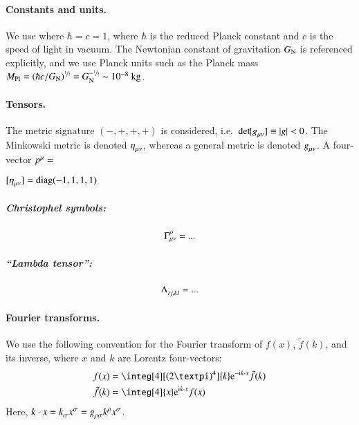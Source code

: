 


\paragraph{Constants and units.} %
We use  where $\hbar = c = 1$, where $\hbar$ is the reduced Planck constant and $c$ is the speed of light in vacuum. The Newtonian constant of gravitation $G_\mathrm{N}$ is referenced explicitly, and we use Planck units such as the Planck mass $M_{\mathrm{Pl}} = \left( \hbar c /G_\mathrm{N} \right)^{\sfrac{1}{2}} = G_\mathrm{N}^{-\sfrac{1}{2}} \sim 10^{-8} ~\mathrm{kg}$. 
%

\paragraph{Tensors.} %
The metric signature $(-,+,+,+)$ is considered, i.e.~$\det~\!\![g\indices{_{\mu\nu}}] \equiv \abs{g} < 0 $. The Minkowski metric is denoted $\eta\indices{_{\mu\nu}}$, whereas a general metric is denoted $g\indices{_{\mu\nu}}$. A four-vector $p\indices{^{\mu}} = $

$[\eta\lo{\mu\nu}] = \text{diag}(-1, 1, 1, 1)$

\subparagraph[Gamma]{Christophel symbols:} %
\begin{equation}
    \tensor*{\Gamma}{^\rho_{\mu \nu}} = ...
\end{equation}

\subparagraph[Lambda]{``Lambda tensor'':} %
\begin{equation}
    \tensor*{\Lambda}{_{ij, kl}} = ...
\end{equation}



\paragraph{Fourier transforms.} %
We use the following convention for the Fourier transform of $f(x)$, $\tilde{f}(k)$, and its inverse, where $x$ and $k$ are Lorentz four-vectors:
\begin{equation}
    \begin{split}
        f(x) &=  \integ[4][(2\ppi)^4]{k} \eu[-\im k\cdot x]\tilde{f}(k)  \\
        \tilde{f}(k) &= \integ[4]{x} \eu[\im k \cdot x] f(x) 
    \end{split}
\end{equation}
Here, $k\cdot x = k\lo{\sigma} x\up{\sigma} = g\lo{\rho\sigma} k\up{\rho} x\up{\sigma}$.


